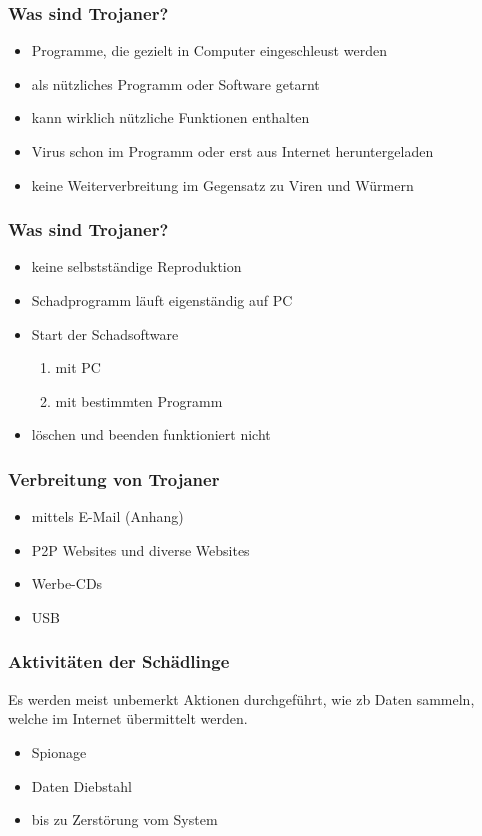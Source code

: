 \documentclass{beamer}
\begin{document}
\begin{frame}
	\frametitle{Was sind Trojaner?}
	\begin{itemize}
		\item Programme, die gezielt in Computer eingeschleust werden
		\item als nützliches Programm oder Software getarnt
		\item kann wirklich nützliche Funktionen enthalten
		\item Virus schon im Programm oder erst aus Internet heruntergeladen
		\item keine Weiterverbreitung im Gegensatz zu Viren und Würmern
	\end{itemize}
\end{frame}

\begin{frame}
	\frametitle{Was sind Trojaner?}
	\begin{itemize}
		\item keine selbstständige Reproduktion
		\item Schadprogramm läuft eigenständig auf PC
		\item Start der Schadsoftware
		\begin{enumerate}
			\item mit PC
			\item mit bestimmten Programm
		\end{enumerate}
		\item löschen und beenden funktioniert nicht 
	\end{itemize}
\end{frame}

\begin{frame}
	\frametitle{Verbreitung von Trojaner}
	\begin{itemize}
		\item mittels E-Mail (Anhang)
		\item P2P Websites und diverse Websites
		\item Werbe-CDs
		\item USB
	\end{itemize}
\end{frame}


\begin{frame}
	\frametitle{Aktivitäten der Schädlinge}
	Es werden meist unbemerkt Aktionen durchgeführt, wie zb Daten sammeln, welche im Internet übermittelt werden.
	\begin{itemize}
		\item Spionage
		\item Daten Diebstahl
		\item bis zu Zerstörung vom System
	\end{itemize}
\end{frame}
\end{document}
